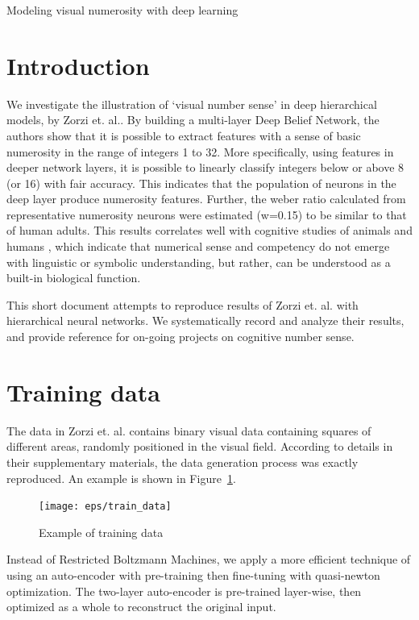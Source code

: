 \documentclass[10pt]{article}
\begin{document}
\centerline{\sc \large Modeling visual numerosity with deep learning } %
\vspace{.5pc}
\centerline{\sc}
\vspace{3pc}
\setlength\parindent{0in}
\section{Introduction}
We investigate the illustration of `visual number sense' in deep hierarchical models, by Zorzi et. al.. By building a multi-layer Deep Belief Network, the authors show that it is possible to extract features with a sense of basic numerosity in the range of integers 1 to 32. More specifically, using features in deeper network layers, it is possible to linearly classify integers below or above 8 (or 16) with fair accuracy. This indicates that the population of neurons in the deep layer produce numerosity features. Further, the weber ratio calculated from representative numerosity neurons were estimated (w=0.15) to be similar to that of human adults. This results correlates well with cognitive studies of animals and humans \cite{Piazza04}, which indicate that numerical sense and competency do not emerge with linguistic or symbolic understanding, but rather, can be understood as a built-in biological function\cite{Nieder05}. 

This short document attempts to reproduce results of Zorzi et. al. with hierarchical neural networks. We systematically record and analyze their results, and provide reference for on-going projects on cognitive number sense. 

\section{Training data}
The data in Zorzi et. al. contains binary visual data containing squares of different areas, randomly positioned in the visual field. According to details in their supplementary materials, the data generation process was exactly reproduced. An example is shown in Figure~\ref{fig:train_data}.

\begin{figure}[tbh]
\centering
\texttt{[image: eps/train\_data]}
\caption{Example of training data}
\label{fig:train_data}
\vspace{-0.3cm}
\end{figure}

Instead of Restricted Boltzmann Machines, we apply a more efficient technique of using an auto-encoder with pre-training then fine-tuning with quasi-newton optimization. The two-layer auto-encoder is pre-trained layer-wise, then optimized as a whole to reconstruct the original input. 
\end{document}
